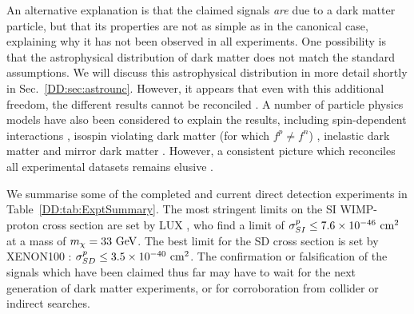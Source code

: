 An alternative explanation is that the claimed signals \textit{are} due to a dark matter particle, but that its properties are not as simple as in the canonical case, explaining why it has not been observed in all experiments. One possibility is that the astrophysical distribution of dark matter does not match the standard assumptions. We will discuss this astrophysical distribution in more detail shortly in Sec.~\ref{DD:sec:astrounc}. However, it appears that even with this additional freedom, the different results cannot be reconciled \cite{Fairbairn:2009,Herrero-Garcia:2012,Fox:2011b,Frandsen:2012}. A number of particle physics models have also been considered to explain the results, including spin-dependent interactions \cite{Buckley:2013}, isospin violating dark matter (for which $f^p \neq f^n$) \cite{Feng:2011}, inelastic dark matter \cite{Smith:2001} and mirror dark matter \cite{Foot:2013}. However, a consistent picture which reconciles all experimental datasets remains elusive \cite{Schwetz:2011}. %

We summarise some of the completed and current direct detection experiments in Table~\ref{DD:tab:ExptSummary}. The most stringent limits on the SI WIMP-proton cross section are set by LUX \cite{Akerib:2014}, who find a limit of $\sigma_{SI}^p \leq 7.6 \times 10^{-46} \textrm{ cm}^2$ at a mass of $m_\chi = 33 \textrm{ GeV}$. The best limit for the SD cross section is set by XENON100 \cite{Aprile:2013c}: $\sigma_{SD}^p \leq 3.5 \times 10^{-40} \textrm{ cm}^2$. The confirmation or falsification of the signals which have been claimed thus far may have to wait for the next generation of dark matter experiments, or for corroboration from collider or indirect searches. 


